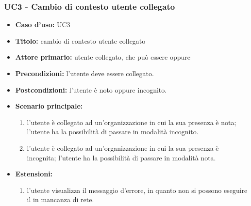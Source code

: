 \documentclass[../analisi-dei-requisiti]{subfiles}
\begin{document}
\subsubsection{UC3 - Cambio di contesto utente collegato}
\label{sub:uc3utente}


\begin{itemize}
  \item \textbf{Caso d’uso:} UC3
  \item \textbf{Titolo:} cambio di contesto utente collegato
  \item \textbf{Attore primario:} utente collegato, che può essere  oppure 
  \item \textbf{Precondizioni:} l'utente deve essere collegato.
  \item \textbf{Postcondizioni:} l'utente è noto oppure incognito.
  \item \textbf{Scenario principale:} 
  \begin{enumerate}
    \item l'utente è collegato ad un'organizzazione in cui la sua presenza è nota; l'utente ha la possibilità di passare in modalità incognito.
    \item l'utente è collegato ad un'organizzazione in cui la sua presenza è incognita; l'utente ha la possibilità di passare in modalità nota.
  \end{enumerate}
  \item \textbf{Estensioni:} 
  \begin{enumerate}
    \item l'utente visualizza il messaggio d'errore, in quanto non si possono eseguire il  in mancanza di rete.
  \end{enumerate}
\end{itemize}
\end{document}
